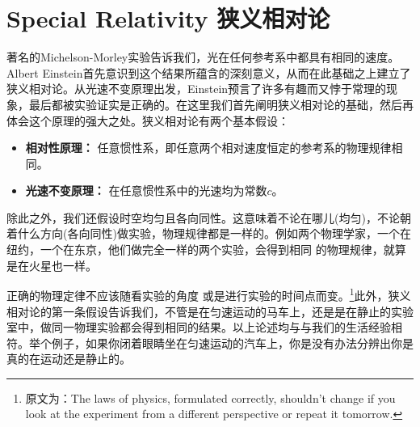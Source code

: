 



\chapter[狭义相对论]{Special Relativity \quad 狭义相对论}
\label{chap2}
 著名的Michelson-Morley实验告诉我们，光在任何参考系中都具有相同的速度。Albert Einstein首先意识到这个结果所蕴含的深刻意义，从而在此基础之上建立了狭义相对论。从光速不变原理出发，Einstein预言了许多有趣而又悖于常理的现象，最后都被实验证实是正确的。在这里我们首先阐明狭义相对论的基础，然后再体会这个原理的强大之处。狭义相对论有两个基本假设：
 \begin{itemize}
   \item {\bf{相对性原理：}} 任意惯性系，即任意两个相对速度恒定的参考系的物理规律相同。
   \item {\bf{光速不变原理：}} 在任意惯性系中的光速均为常数$c$。
 \end{itemize}
除此之外，我们还假设时空均匀且各向同性。这意味着不论在哪儿(均匀)，不论朝着什么方向(各向同性)做实验，物理规律都是一样的。例如两个物理学家，一个在纽约，一个在东京，他们做完全一样的两个实验，会得到相同
  的物理规律，就算是在火星也一样。

正确的物理定律不应该随看实验的角度%
或是进行实验的时间点而变。\footnote{原文为：The laws of physics, formulated correctly, shouldn't change if you look at the experiment from a different perspective or repeat it tomorrow.}此外，狭义相对论的第一条假设告诉我们，不管是在匀速运动的马车上，还是是在静止的实验室中，做同一物理实验都会得到相同的结果。以上论述均与与我们的生活经验相符。举个例子，如果你闭着眼睛坐在匀速运动的汽车上，你是没有办法分辨出你是真的在运动还是静止的。

